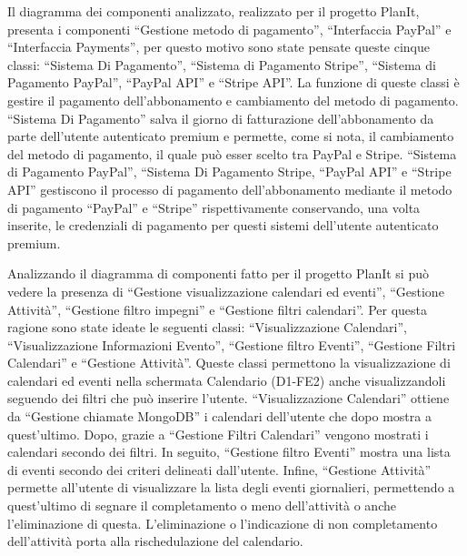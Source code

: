 \begin{listaPersonale}[DCL]{}
\begin{listaPersonale2}[DCL]{}
        Il diagramma dei componenti analizzato, realizzato per il progetto PlanIt, presenta i componenti “Gestione metodo di pagamento”, “Interfaccia PayPal” e “Interfaccia Payments”, per questo motivo sono state pensate queste cinque classi: “Sistema Di Pagamento”, “Sistema di Pagamento Stripe”, “Sistema di Pagamento PayPal”, “PayPal API” e “Stripe API”. La funzione di queste classi è gestire il pagamento dell'abbonamento e cambiamento del metodo di pagamento. “Sistema Di Pagamento” salva il giorno di fatturazione dell'abbonamento da parte dell'utente autenticato premium e  permette, come si nota, il cambiamento del metodo di pagamento, il quale può esser scelto tra PayPal e Stripe.
        “Sistema di Pagamento PayPal”, “Sistema Di Pagamento Stripe, “PayPal API” e “Stripe API” gestiscono il processo di pagamento dell'abbonamento mediante il metodo di pagamento “PayPal” e “Stripe” rispettivamente conservando, una volta inserite, le credenziali di pagamento per questi sistemi dell'utente autenticato premium.

    \end{listaPersonale2}


    Analizzando il diagramma di componenti fatto per il progetto PlanIt si può vedere la presenza di “Gestione visualizzazione calendari ed eventi”, “Gestione Attività”, “Gestione filtro impegni” e “Gestione filtri calendari”. Per questa ragione sono state ideate le seguenti classi: “Visualizzazione Calendari”,  “Visualizzazione Informazioni Evento”, “Gestione filtro Eventi”, “Gestione Filtri Calendari” e “Gestione Attività”. Queste classi permettono la visualizzazione di calendari ed eventi nella schermata Calendario (D1-FE2) anche visualizzandoli seguendo dei filtri che può inserire l'utente.
    “Visualizzazione Calendari” ottiene da “Gestione chiamate MongoDB” i calendari dell'utente che dopo mostra a quest'ultimo. Dopo, grazie a “Gestione Filtri Calendari” vengono mostrati i calendari secondo dei filtri.
    In seguito, “Gestione filtro Eventi” mostra una lista di eventi secondo dei criteri delineati dall'utente.
    Infine, “Gestione Attività”  permette all'utente di visualizzare la lista degli eventi giornalieri, permettendo a quest'ultimo di segnare il completamento o meno dell'attività o anche l'eliminazione di questa. L'eliminazione o l'indicazione di non completamento dell'attività porta alla rischedulazione del calendario.



\end{listaPersonale}
